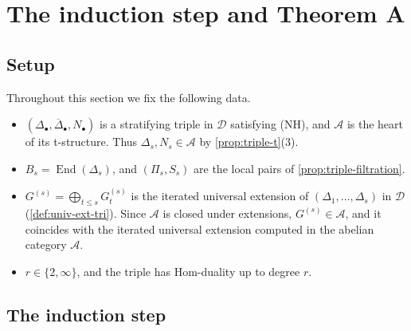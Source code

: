 \documentclass[11pt,reqno]{amsart}
\theoremstyle{plain}
\theoremstyle{definition}
\theoremstyle{remark}
\DeclareMathOperator{\End}{End}
\newcommand{\Deltabar}{\overline{\Delta}}
\newcommand{\cD}{\mathcal{D}}
\newcommand{\cA}{\mathcal{A}}
\begin{document}
\section{The induction step and Theorem A}\label{sec:gluing}

\subsection{Setup}
Throughout this section we fix the following data.
\begin{itemize}
\item $(\Delta_\bullet,\Deltabar_\bullet,N_\bullet)$ is a stratifying triple in $\cD$ satisfying (NH), and $\cA$ is the heart of its t-structure. Thus $\Delta_s,N_s\in\cA$ by \cref{prop:triple-t}(3).
\item $B_s=\End(\Delta_s)$, and $(\Pi_s,S_s)$ are the local pairs of \cref{prop:triple-filtration}.
\item $G^{(s)}=\bigoplus_{t\le s}G^{(s)}_t$ is the iterated universal extension of $(\Delta_1,\dots,\Delta_s)$ in $\cD$ (\cref{def:univ-ext-tri}). Since $\cA$ is closed under extensions, $G^{(s)}\in\cA$, and it coincides with the iterated universal extension computed in the abelian category $\cA$.
\item $r\in\{2,\infty\}$, and the triple has Hom-duality up to degree $r$.
\end{itemize}

\subsection{The induction step}
\end{document}
